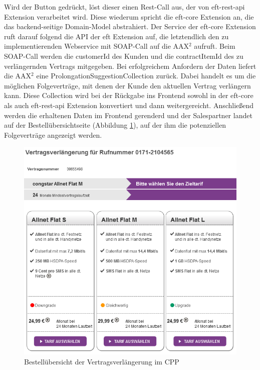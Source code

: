 \documentclass[11pt,a4paper]{article}
\begin{document}
Wird der Button gedrückt, löst dieser einen Rest-Call aus, der von eft-rest-api Extension
verarbeitet wird. Diese wiederum spricht die eft-core Extension an, die das backend-seitige Domain-Model abstrahiert. Der Service der eft-core Extension ruft darauf folgend 
die API der eft Extension auf, die letztendlich den zu implementierenden Webservice mit SOAP-Call
auf die AAX$^2$ aufruft. Beim SOAP-Call werden die customerId des Kunden und die contractItemId des zu verlängernden Vertrags mitgegeben. 
Bei erfolgreichem Anfordern der Daten liefert die AAX$^2$ eine ProlongationSuggestionCollection zurück. 
Dabei handelt es um die möglichen Folgeverträge, mit denen 
der Kunde den aktuellen Vertrag verlängern kann. Diese Collection wird bei der Rückgabe ins Frontend sowohl in der eft-core als auch eft-rest-api Extension konvertiert und dann weitergereicht. Anschließend werden die erhaltenen Daten im Frontend gerenderd und der Salespartner landet auf der Bestellübersichtseite (Abbildung \ref{fig:auswahl}), auf der ihm die potenziellen Folgeverträge angezeigt werden. 

\begin{figure}[h]
\includegraphics[width=\textwidth]{images/auswahl.png}
\caption{Bestellübersicht der Vertragsverlängerung im CPP \cite{congstarv}}
\centering
\label{fig:auswahl}
\end{figure}
\end{document}
